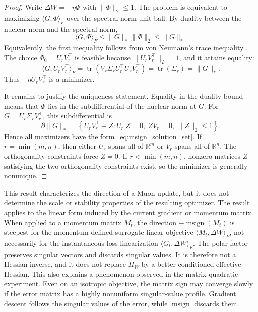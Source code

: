 \documentclass[sigconf,nonacm]{acmart}
\begin{document}
\begin{proof}
Write $\Delta W=-\eta\Phi$ with $\|\Phi\|_2\leq1$. The problem is equivalent to maximizing $\langle G,\Phi\rangle_F$ over the spectral-norm unit ball. By duality between the nuclear norm and the spectral norm,
\begin{equation}
  \langle G,\Phi\rangle_F\leq \|G\|_*\|\Phi\|_2\leq\|G\|_*.
\end{equation}
Equivalently, the first inequality follows from von Neumann's trace inequality \citep{horn2012matrix}. The choice $\Phi_0=U_rV_r^\top$ is feasible because $\|U_rV_r^\top\|_2=1$, and it attains equality:
\begin{equation}
  \langle G,U_rV_r^\top\rangle_F
  =\operatorname{tr}(V_r\Sigma_rU_r^\top U_rV_r^\top)
  =\operatorname{tr}(\Sigma_r)=\|G\|_*.
\end{equation}
Thus $-\eta U_rV_r^\top$ is a minimizer.

It remains to justify the uniqueness statement. Equality in the duality bound means that $\Phi$ lies in the subdifferential of the nuclear norm at $G$. For $G=U_r\Sigma_rV_r^\top$, this subdifferential is
\begin{equation}
  \partial\|G\|_*=
  \left\{U_rV_r^\top+Z:
  U_r^\top Z=0,\ ZV_r=0,\ \|Z\|_2\leq1\right\}.
\end{equation}
Hence all maximizers have the form~\eqref{eq:msign_solution_set}. If $r=\min(m,n)$, then either $U_r$ spans all of $\mathbb{R}^m$ or $V_r$ spans all of $\mathbb{R}^n$. The orthogonality constraints force $Z=0$. If $r<\min(m,n)$, nonzero matrices $Z$ satisfying the two orthogonality constraints exist, so the minimizer is generally nonunique.
\end{proof}

This result characterizes the direction of a Muon update, but it does not determine the scale or stability properties of the resulting optimizer. The result applies to the linear form induced by the current gradient or momentum matrix. When applied to a momentum matrix $M_t$, the direction $-\operatorname{msign}(M_t)$ is steepest for the momentum-defined surrogate linear objective $\langle M_t,\Delta W\rangle_F$, not necessarily for the instantaneous loss linearization $\langle G_t,\Delta W\rangle_F$. The polar factor preserves singular vectors and discards singular values. It is therefore not a Hessian inverse, and it does not replace $H_W$ by a better-conditioned effective Hessian. This also explains a phenomenon observed in the matrix-quadratic experiment. Even on an isotropic objective, the matrix sign may converge slowly if the error matrix has a highly nonuniform singular-value profile. Gradient descent follows the singular values of the error, while $\operatorname{msign}$ discards them.
\end{document}
